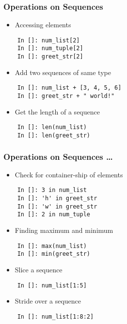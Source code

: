 \begin{frame}[fragile]
  \frametitle{Operations on Sequences}
  \begin{itemize}
  \item Accessing elements
  \end{itemize}
  \begin{lstlisting}
    In []: num_list[2] 
    In []: num_tuple[2]
    In []: greet_str[2]
  \end{lstlisting}
  \begin{itemize}
  \item Add two sequences of same type
  \end{itemize}
  \begin{lstlisting}
    In []: num_list + [3, 4, 5, 6]
    In []: greet_str + " world!"  
  \end{lstlisting}
  \begin{itemize}
  \item Get the length of a sequence
  \end{itemize}
  \begin{lstlisting}
    In []: len(num_list) 
    In []: len(greet_str)
  \end{lstlisting}
\end{frame}

\begin{frame}[fragile]
  \frametitle{Operations on Sequences \ldots}
  \begin{itemize}
  \item Check for container-ship of  elements
  \end{itemize}
  \begin{lstlisting}
    In []: 3 in num_list
    In []: 'h' in greet_str
    In []: 'w' in greet_str
    In []: 2 in num_tuple
  \end{lstlisting}
  \begin{itemize}
  \item Finding maximum and minimum 
  \end{itemize}
  \begin{lstlisting}
    In []: max(num_list)
    In []: min(greet_str)
  \end{lstlisting}
  \begin{itemize}
  \item Slice a sequence
  \end{itemize}
  \begin{lstlisting}
    In []: num_list[1:5]
  \end{lstlisting}
  \begin{itemize}
  \item Stride over a sequence
  \end{itemize}
  \begin{lstlisting}
    In []: num_list[1:8:2]
  \end{lstlisting}
\end{frame}

